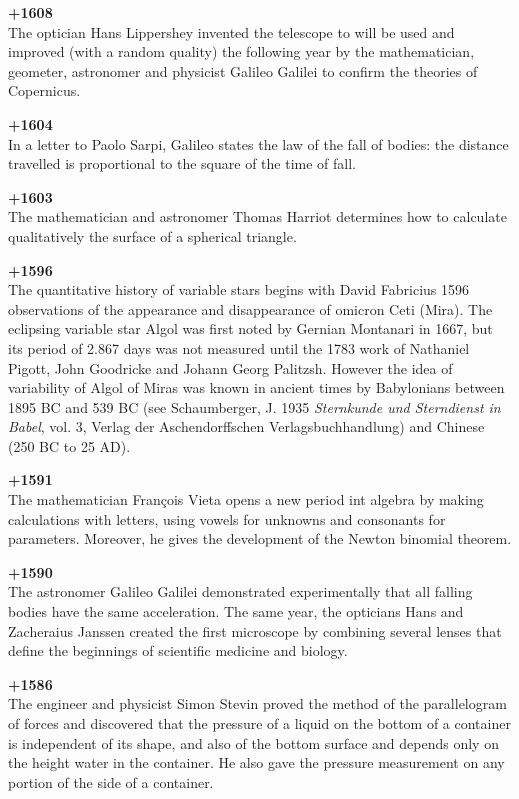 \textbf{+1608}\\
The optician Hans Lippershey invented the telescope to will be used and improved (with a random quality) the following year by the mathematician, geometer, astronomer and physicist Galileo Galilei to confirm the theories of Copernicus.

\textbf{+1604}\\
In a letter to Paolo Sarpi, Galileo states the law of the fall of bodies: the distance travelled is proportional to the square of the time of fall.

\textbf{+1603}\\
The mathematician and astronomer Thomas Harriot determines how to calculate qualitatively the surface of a spherical triangle.

\textbf{+1596}\\
The quantitative history of variable stars begins with David Fabricius 1596 observations of the appearance and disappearance of omicron Ceti (Mira). The eclipsing variable star Algol was first noted by Gernian Montanari in 1667, but its period of 2.867 days was not measured until the 1783 work of Nathaniel Pigott, John Goodricke and Johann Georg Palitzsh. However the idea of variability of Algol of Miras was known in ancient times by Babylonians between 1895 BC and 539 BC (see Schaumberger, J. 1935 \textit{Sternkunde und Sterndienst in Babel}, vol. 3, Verlag der Aschendorffschen Verlagsbuchhandlung) and Chinese (250 BC to 25 AD).

\textbf{+1591}\\
The mathematician François Vieta opens a new period int algebra by making calculations with letters, using vowels for unknowns and consonants for parameters. Moreover, he gives the development of the Newton binomial theorem.

\textbf{+1590}\\
The astronomer Galileo Galilei demonstrated experimentally that all falling bodies have the same acceleration. The same year, the opticians Hans and Zacheraius Janssen created the first microscope by combining several lenses that define the beginnings of scientific medicine and biology.

\textbf{+1586}\\
The engineer and physicist Simon Stevin proved the method of the parallelogram of forces and discovered that the pressure of a liquid on the bottom of a container is independent of its shape, and also of the bottom surface and depends only on the height water in the container. He also gave the pressure measurement on any portion of the side of a container.

